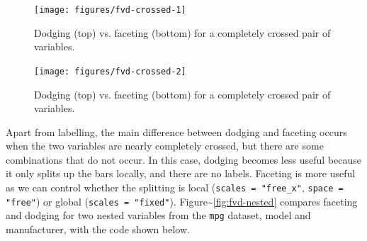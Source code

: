 \begin{Shaded}
\begin{Highlighting}[]
  \NormalTok{, } 
   \NormalTok{)}
\end{Highlighting}
\end{Shaded}

\begin{figure}
\texttt{[image: figures/fvd-crossed-1]} \caption{Dodging (top) vs. faceting (bottom) for a completely crossed pair of variables.\label{fig:fvd-crossed1}}
\end{figure}

\begin{Shaded}
\begin{Highlighting}[]
  \NormalTok{, } \StringTok{ }
\StringTok{  }\StringTok{ }\StringTok{ }
\StringTok{  }\NormalTok{(} \NormalTok{(} \NormalTok{, } \NormalTok{, } \NormalTok{, }
    \NormalTok{))}
\end{Highlighting}
\end{Shaded}

\begin{figure}
\texttt{[image: figures/fvd-crossed-2]} \caption{Dodging (top) vs. faceting (bottom) for a completely crossed pair of variables.\label{fig:fvd-crossed2}}
\end{figure}

Apart from labelling, the main difference between dodging and faceting
occurs when the two variables are nearly completely crossed, but there
are some combinations that do not occur. In this case, dodging becomes
less useful because it only splits up the bars locally, and there are no
labels. Faceting is more useful as we can control whether the splitting
is local (\texttt{scales = "free\_x"}, \texttt{space = "free"}) or
global (\texttt{scales = "fixed"}).
Figure\textasciitilde{}\ref{fig:fvd-nested} compares faceting and
dodging for two nested variables from the \texttt{mpg} dataset, model
and manufacturer, with the code shown below.

